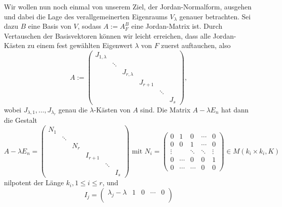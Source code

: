 \begin{bemerkung}
	\label{bem:9.14}
	Wir wollen nun noch einmal von unserem Ziel, der Jordan-Normalform, ausgehen und dabei die Lage des verallgemeinerten Eigenraums $V_\lambda$ genauer betrachten.
	Sei dazu $B$ eine Basis von $V$, sodass $A := A_F^B$ eine Jordan-Matrix ist.
	Durch Vertauschen der Basisvektoren können wir leicht erreichen, dass alle Jordan-Kästen zu einem fest gewählten Eigenwert $\lambda$ von $F$ zuerst auftauchen, also
	\[
		A:= \begin{pmatrix}
			J_{1,\lambda} &        &               &         &        &  \\
			              & \ddots &               &         &        &  \\
			              &        & J_{r,\lambda} &         &        &  \\
			              &        &               & J_{r+1} &        &  \\
			              &        &               &         & \ddots &  \\
			              &        &               &         &        & J_s
		\end{pmatrix},
	\]
	wobei $J_{\lambda,1},\dots,J_{\lambda_r}$ genau die $\lambda$-Kästen von $A$ sind.
	Die Matrix $A - \lambda E_n$ hat dann die Gestalt
	\[
		A - \lambda E_n = \begin{pmatrix}
		N_1 &        &               &         &        &  \\
		& \ddots &               &         &        &  \\
		&        & N_r &         &        &  \\
		&        &               & I_{r+1} &        &  \\
		&        &               &         & \ddots &  \\
		&        &               &         &        & I_s
		\end{pmatrix} \text{ mit } N_i = \begin{pmatrix}
		0 & 1 & 0 & \cdots & 0 \\ 
		0 & 0 & 1 & \cdots & 0 \\ 
		\vdots &  & \ddots & \ddots & \vdots \\ 
		0 & \cdots & 0 & 0 & 1 \\ 
		0 & \cdots & \cdots & 0 & 0
		\end{pmatrix} \in M(k_i \times k_i,K)
	\]
	nilpotent der Länge $k_i, 1 \leq i \leq r$, und
	\[
		I_j = \begin{pmatrix}
		\lambda_j - \lambda & 1 & 0 & \cdots & 0 \\ 

\end{pmatrix}\]
\end{bemerkung}
